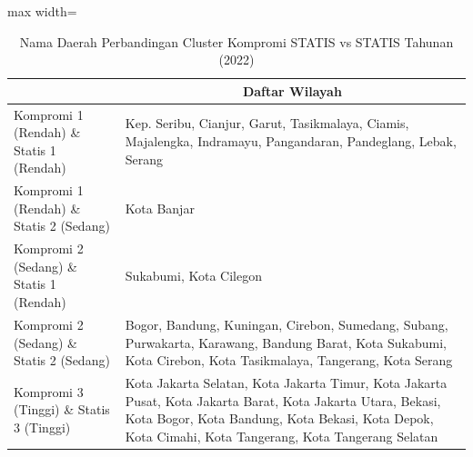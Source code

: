 \begin{table}[H]
\centering
\caption{Nama Daerah Perbandingan Cluster Kompromi STATIS vs STATIS Tahunan (2022)} \label{tab:app1comp_statis_name_2022}
\begin{adjustbox}{max width=\textwidth}
\begin{tabular}{|>{\centering\arraybackslash}p{4cm}|p{10cm}|}
\hline
\multicolumn{1}{|c|}{\textbf{Kategori}} & \multicolumn{1}{c|}{\textbf{Daftar Wilayah}} \\
\hline
Kompromi 1 (Rendah) \& Statis 1 (Rendah) & Kep. Seribu, Cianjur, Garut, Tasikmalaya, Ciamis, Majalengka, Indramayu, Pangandaran, Pandeglang, Lebak, Serang \\
\hline
Kompromi 1 (Rendah) \& Statis 2 (Sedang) & Kota Banjar \\
\hline
Kompromi 2 (Sedang) \& Statis 1 (Rendah) & Sukabumi, Kota Cilegon \\
\hline
Kompromi 2 (Sedang) \& Statis 2 (Sedang) & Bogor, Bandung, Kuningan, Cirebon, Sumedang, Subang, Purwakarta, Karawang, Bandung Barat, Kota Sukabumi, Kota Cirebon, Kota Tasikmalaya, Tangerang, Kota Serang \\
\hline
Kompromi 3 (Tinggi) \& Statis 3 (Tinggi) & Kota Jakarta Selatan, Kota Jakarta Timur, Kota Jakarta Pusat, Kota Jakarta Barat, Kota Jakarta Utara, Bekasi, Kota Bogor, Kota Bandung, Kota Bekasi, Kota Depok, Kota Cimahi, Kota Tangerang, Kota Tangerang Selatan \\
\hline
\end{tabular}
\end{adjustbox}
\end{table}